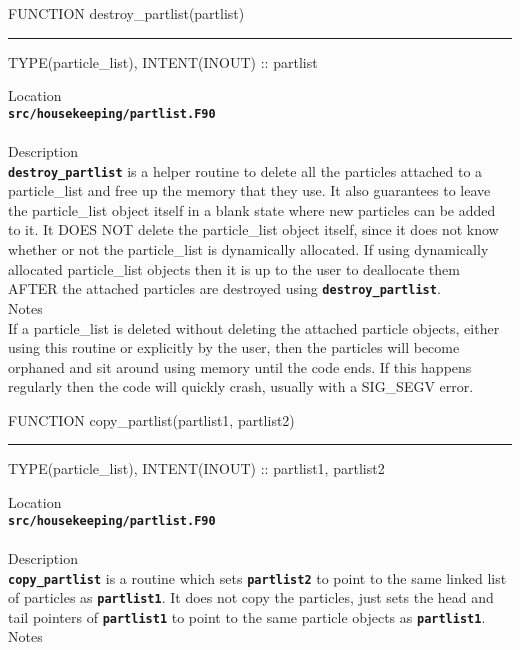 \documentclass[12pt,a4paper]{article}
\newcommand{\HRule}{\rule[0.3cm]{\linewidth}{0.5mm}}
\newcommand{\inlinecode}[1]{{\color{warwickred} \bf\texttt{#1}}}
\begin{document}
\pagebreak
\begin{codedef}
FUNCTION destroy_partlist(partlist)
\HRule
TYPE(particle_list), INTENT(INOUT) :: partlist
\end{codedef}
\vspace{1cm}
{\Large Location\\}
\inlinecode{src/housekeeping/partlist.F90}\\
\\[0.5cm]
{\Large Description\\}
\inlinecode{destroy\_partlist} is a helper routine to delete all the particles
attached to a particle\_list and free up the memory that they use. It also
guarantees to leave the particle\_list object itself in a blank state where new
particles can be added to it. It DOES NOT delete the particle\_list object
itself, since it does not know whether or not the particle\_list is dynamically
allocated. If using dynamically allocated particle\_list objects then it is up
to the user to deallocate them AFTER the attached particles are destroyed using
\inlinecode{destroy\_partlist}.
\\[0.5cm]
{\Large Notes\\}
If a particle\_list is deleted without deleting the attached particle objects,
either using this routine or explicitly by the user, then the particles will
become orphaned and sit around using memory until the code ends. If this
happens regularly then the code will quickly crash, usually with a SIG\_SEGV
error.

\pagebreak
\begin{codedef}
FUNCTION copy_partlist(partlist1, partlist2)
\HRule
TYPE(particle_list), INTENT(INOUT) :: partlist1, partlist2
\end{codedef}
\vspace{1cm}
{\Large Location\\}
\inlinecode{src/housekeeping/partlist.F90}\\
\\[0.5cm]
{\Large Description\\}
\inlinecode{copy\_partlist} is a routine which sets \inlinecode{partlist2} to
point to the same linked list of particles as \inlinecode{partlist1}. It does
not copy the particles, just sets the head and tail pointers of
\inlinecode{partlist1} to point to the same particle objects as
\inlinecode{partlist1}.
\\[0.5cm]
{\Large Notes\\}
\end{document}
